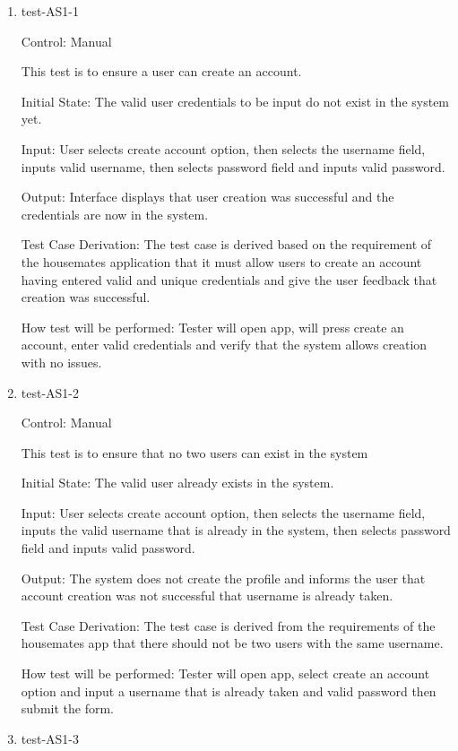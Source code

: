 \documentclass[12pt, titlepage]{article}
\begin{document}
\begin{enumerate}

\item{test-AS1-1\\}

Control: Manual

This test is to ensure a user can create an account.

Initial State: The valid user credentials to be input do not exist in the system yet.
					
Input: User selects create account option, then selects the username field, inputs valid username, then selects password field and inputs valid password.
					
Output: Interface displays that user creation was successful and the credentials are now in the system.

Test Case Derivation: The test case is derived based on the requirement of the housemates application that it must allow users to create an account having entered valid and unique credentials and give the user feedback that creation was successful.
					
How test will be performed: Tester will open app, will press create an account, enter valid credentials and verify that the system allows creation with no issues.
					
\item{test-AS1-2\\}

Control: Manual

This test is to ensure that no two users can exist in the system

Initial State: The valid user already exists in the system.
					
Input: User selects create account option, then selects the username field, inputs the valid username that is already in the system, then selects password field and inputs valid password.
					
Output: The system does not create the profile and informs the user that account creation was not successful that username is already taken.

Test Case Derivation: The test case is derived from the requirements of the housemates app that there should not be two users with the same username.

How test will be performed: Tester will open app, select create an account option and input a username that is already taken and valid password then submit the form.

\item{test-AS1-3\\}


\end{enumerate}
\end{document}
